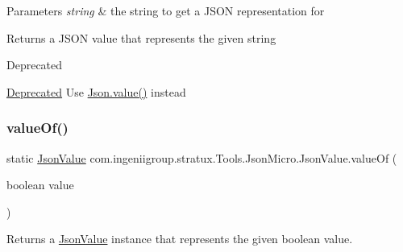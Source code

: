 \begin{DoxyParams}{Parameters}
{\em string} & the string to get a J\+S\+ON representation for \\
\hline
\end{DoxyParams}
\begin{DoxyReturn}{Returns}
a J\+S\+ON value that represents the given string 
\end{DoxyReturn}
\begin{DoxyRefDesc}{Deprecated}
\item[\hyperlink{deprecated__deprecated000014}{Deprecated}]Use {\ttfamily \hyperlink{classcom_1_1ingeniigroup_1_1stratux_1_1_tools_1_1_json_micro_1_1_json_aa7a17dbf2bbb667284cb5a86d404bf6d}{Json.\+value()}} instead \end{DoxyRefDesc}
\mbox{\label{classcom_1_1ingeniigroup_1_1stratux_1_1_tools_1_1_json_micro_1_1_json_value_a58bb07f165bad8f405ebfb193ccb9d96}} 
\subsubsection{\texorpdfstring{value\+Of()}{valueOf()}\hspace{0.1cm}{\footnotesize\ttfamily [6/6]}}
{\footnotesize\ttfamily static \hyperlink{classcom_1_1ingeniigroup_1_1stratux_1_1_tools_1_1_json_micro_1_1_json_value}{Json\+Value} com.\+ingeniigroup.\+stratux.\+Tools.\+Json\+Micro.\+Json\+Value.\+value\+Of (\begin{DoxyParamCaption}\item[{boolean}]{value }\end{DoxyParamCaption})\hspace{0.3cm}{\ttfamily [static]}}

Returns a \hyperlink{classcom_1_1ingeniigroup_1_1stratux_1_1_tools_1_1_json_micro_1_1_json_value}{Json\+Value} instance that represents the given {\ttfamily boolean} value.


